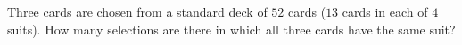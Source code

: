Three cards are chosen from a standard deck of $52$ cards ($13$ cards in each of $4$ suits). How many selections are there in which all three cards have the same suit?
